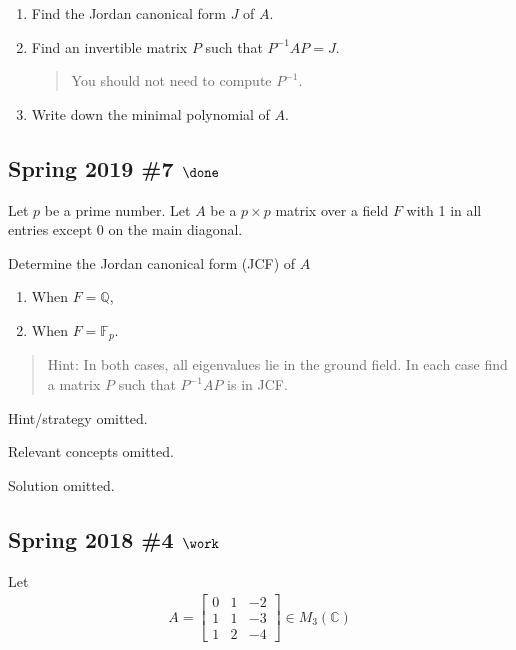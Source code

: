 \begin{enumerate}
\def\labelenumi{\alph{enumi}.}
\item
  Find the Jordan canonical form \(J\) of \(A\).
\item
  Find an invertible matrix \(P\) such that \(P^{-1}A P = J\).

  \begin{quote}
  You should not need to compute \(P^{-1}\).
  \end{quote}
\item
  Write down the minimal polynomial of \(A\).
\end{enumerate}

\hypertarget{spring-2019-7-done}{%
\subsection{\texorpdfstring{Spring 2019 \#7
\(\done\)}{Spring 2019 \#7 \textbackslash done}}\label{spring-2019-7-done}}

Let \(p\) be a prime number. Let \(A\) be a \(p \times p\) matrix over a
field \(F\) with 1 in all entries except 0 on the main diagonal.

Determine the Jordan canonical form (JCF) of \(A\)

\begin{enumerate}
\def\labelenumi{\alph{enumi}.}
\item
  When \(F = {\mathbb{Q}}\),
\item
  When \(F = {\mathbb{F}}_p\).
\end{enumerate}

\begin{quote}
Hint: In both cases, all eigenvalues lie in the ground field. In each
case find a matrix \(P\) such that \(P^{-1}AP\) is in JCF.
\end{quote}

Hint/strategy omitted.

Relevant concepts omitted.

Solution omitted.

\hypertarget{spring-2018-4-work}{%
\subsection{\texorpdfstring{Spring 2018 \#4
\(\work\)}{Spring 2018 \#4 \textbackslash work}}\label{spring-2018-4-work}}

Let
\begin{align*}
A=\left[\begin{array}{lll}{0} & {1} & {-2} \\ {1} & {1} & {-3} \\ {1} & {2} & {-4}\end{array}\right] \in M_{3}(\mathbb{C})
\end{align*}

